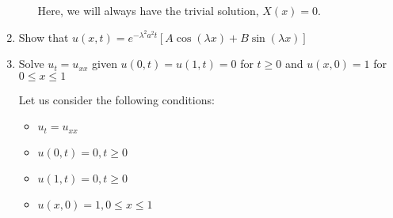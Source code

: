 \documentclass{article}
\begin{document}
\begin{enumerate}
\begin{enumerate}
  Here, we will always have the trivial solution, $X(x) = 0$.

\end{enumerate}
%
%
\newpage
%
%
  \item Show that $u(x, t) = e^{-\lambda^2 a^2 t}\left[ A \cos(\lambda x) + B \sin(\lambda x) \right]$

%



%
%
\newpage
%
%
  \item Solve $u_t = u_{xx}$ given $u(0, t) = u(1, t) = 0$ for $t \geq 0$ and $u(x, 0) = 1$ for $0 \leq x \leq 1$
%
%

Let us consider the following conditions:
%
\begin{itemize}
  \item $u_t = u_{xx}$
  \item $u(0, t) = 0, t \geq 0$
  \item $u(1, t) = 0, t \geq 0$
  \item $u(x, 0) = 1, 0 \leq x \leq 1$
\end{itemize}


\end{enumerate}
\end{document}
